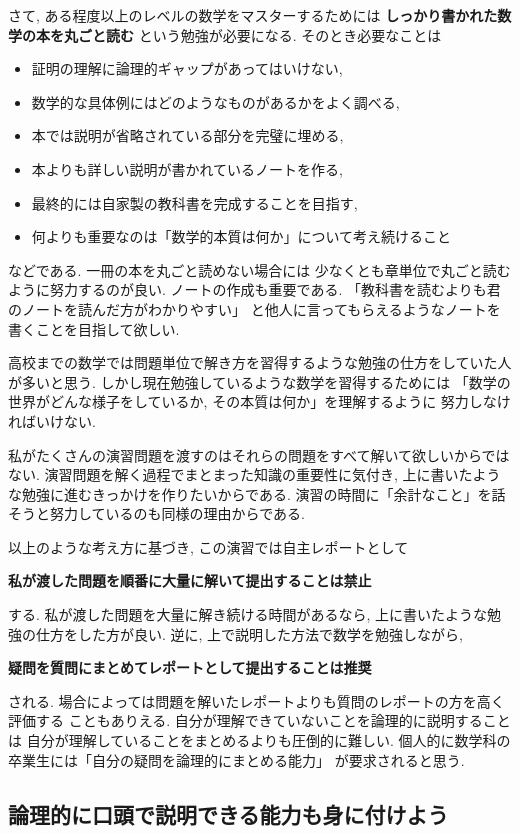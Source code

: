 \documentclass[12pt,twoside]{jarticle}
\begin{document}
さて, ある程度以上のレベルの数学をマスターするためには
{\bf しっかり書かれた数学の本を丸ごと読む}
という勉強が必要になる. そのとき必要なことは
\begin{itemize}
 \item 証明の理解に論理的ギャップがあってはいけない,
 \item 数学的な具体例にはどのようなものがあるかをよく調べる,
 \item 本では説明が省略されている部分を完璧に埋める,
 \item 本よりも詳しい説明が書かれているノートを作る,
 \item 最終的には自家製の教科書を完成することを目指す,
 \item 何よりも重要なのは「数学的本質は何か」について考え続けること
\end{itemize}
などである. 
一冊の本を丸ごと読めない場合には
少なくとも章単位で丸ごと読むように努力するのが良い.
ノートの作成も重要である.
「教科書を読むよりも君のノートを読んだ方がわかりやすい」
と他人に言ってもらえるようなノートを書くことを目指して欲しい.

高校までの数学では問題単位で解き方を習得するような勉強の仕方をしていた人
が多いと思う. しかし現在勉強しているような数学を習得するためには
「数学の世界がどんな様子をしているか, その本質は何か」を理解するように
努力しなければいけない. 

私がたくさんの演習問題を渡すのはそれらの問題をすべて解いて欲しいからでは
ない. 演習問題を解く過程でまとまった知識の重要性に気付き, 
上に書いたような勉強に進むきっかけを作りたいからである.
演習の時間に「余計なこと」を話そうと努力しているのも同様の理由からである.

以上のような考え方に基づき, 
この演習では自主レポートとして
\begin{center}
 \large\bf 私が渡した問題を順番に大量に解いて提出することは禁止
\end{center}
する. 私が渡した問題を大量に解き続ける時間があるなら, 
上に書いたような勉強の仕方をした方が良い.
逆に, 上で説明した方法で数学を勉強しながら, 
\begin{center}
 \large\bf 疑問を質問にまとめてレポートとして提出することは推奨
\end{center}
される.
場合によっては問題を解いたレポートよりも質問のレポートの方を高く評価する
こともありえる.  自分が理解できていないことを論理的に説明することは
自分が理解していることをまとめるよりも圧倒的に難しい.
個人的に数学科の卒業生には「自分の疑問を論理的にまとめる能力」
が要求されると思う.

\subsection{論理的に口頭で説明できる能力も身に付けよう}
\end{document}
